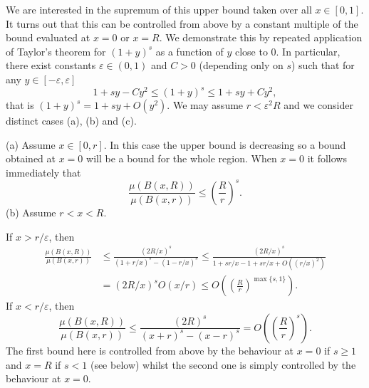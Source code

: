 We are interested in the supremum of this upper bound taken over all $x \in [0,1]$.  It turns out that this can be controlled from above by a constant  multiple of the bound evaluated at $x=0$ or $x=R$.  We demonstrate this by repeated application of Taylor's theorem for   $(1+y)^s$ as a function of $y$ close to 0. In particular,   there exist constants $\varepsilon \in (0,1)$ and $C > 0$ (depending only on $s$) such that for any $y \in [-\varepsilon, \varepsilon]$
\[
1 + s y - C y^2 \le (1+y)^s \le 1 + s y + C y^2,
\]
that is $ (1+y)^s = 1 + s y +O( y^2)$.  We may assume $r<\varepsilon^2 R$ and we consider distinct cases (a), (b) and (c).

\noindent (a) Assume $x\in [0,r]$.  In this case the upper bound is decreasing so a bound obtained at $x = 0$ will be a bound for the whole region. When $x=0$ it follows immediately that
\[
\frac{\mu(B(x,R))}{\mu(B(x,r))} \le \left(\frac{R}{r}\right)^s.
\]
\noindent (b) Assume $r < x < R$. 

If  $x > r/\varepsilon$, then 
\begin{align*}
\frac{\mu(B(x,R))}{\mu(B(x,r))} &\le \frac{(2R/x)^s}{(1+r/x)^s - (1-r/x)^s} \le \frac{(2R/x)^s}{1+sr/x-1+sr/x + O((r/x)^2)}\\ 
&=  (2R/x)^s O(x/r) \le O\left(\left(\frac{R}{r}\right)^{\max\{s,1\}}\right).    
\end{align*}
If $x < r/\varepsilon$, then 
\[
\frac{\mu(B(x,R))}{\mu(B(x,r))} \le \frac{(2R)^s}{(x+r)^s - (x-r)^s} = O\left(\left(\frac{R}{r}\right)^s\right).
\]
The first bound here is controlled from above by the behaviour at  $x=0$ if $s \geq 1$ and $x=R$ if $s <1$ (see below) whilst the second one is simply controlled by the behaviour at $x=0$. 


